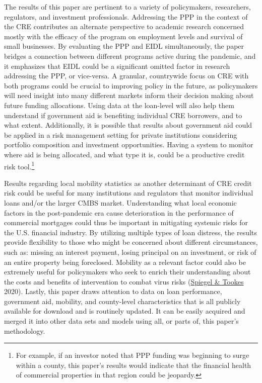 \documentclass[11pt]{article} %
\begin{document}
The results of this paper are pertinent to a variety of policymakers, researchers, regulators, and investment professionals. Addressing the PPP in the context of the CRE contributes an alternate perspective to academic research concerned mostly with the efficacy of the program on employment levels and survival of small businesses. By evaluating the PPP and EIDL simultaneously, the paper bridges a connection between different programs active during the pandemic, and it emphasizes that EIDL could be a significant omitted factor in research addressing the PPP, or vice-versa. A granular, countrywide focus on CRE with both programs could be crucial to improving policy in the future, as policymakers will need insight into many different markets inform their decision making about future funding allocations. Using data at the loan-level will also help them understand if government aid is benefiting individual CRE borrowers, and to what extent. Additionally, it is possible that results about government aid could be applied in a risk management setting for private institutions considering portfolio composition and investment opportunities. Having a system to monitor where aid is being allocated, and what type it is, could be a productive credit risk tool.\footnote{For example, if an investor noted that PPP funding was beginning to surge within a county, this paper's results would indicate that the financial health of commercial properties in that region could be jeopardy.  } 

Results regarding local mobility statistics as another determinant of CRE credit risk could be useful for many institutions and regulators that monitor individual loans and/or the larger CMBS market. Understanding what local economic factors in the post-pandemic era cause deterioration in the performance of commercial mortgages could thus be important in mitigating systemic risks for the U.S. financial industry. By utilizing multiple types of loan distress, the results provide flexibility to those who might be concerned about different circumstances, such as: missing an interest payment, losing principal on an investment, or risk of an entire property being foreclosed. Mobility as a relevant factor could also be extremely useful for policymakers who seek to enrich their understanding about the costs and benefits of intervention to combat virus risks (\hyperlink{Spiegel}{Spiegel \& Tookes} 2020). Lastly, this paper draws attention to data on loan performance, government aid, mobility, and county-level characteristics that is all publicly available for download and is routinely updated. It can be easily acquired and merged it into other data sets and models using all, or parts of, this paper's methodology.
\end{document}
